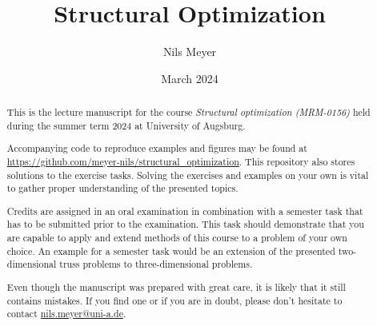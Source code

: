 \documentclass[a4paper]{report}
\title{Structural Optimization}
\author{Nils Meyer}
\date{March 2024}
\begin{document}
\maketitle

\begin{abstract}
    This is the lecture manuscript for the course \emph{Structural optimization (MRM-0156)} held during the summer term 2024 at University of Augsburg. 

    Accompanying code to reproduce examples and figures may be found at \url{https://github.com/meyer-nils/structural_optimization}. This repository also stores solutions to the exercise tasks. Solving the exercises and examples on your own is vital to gather proper understanding of the presented topics. 

    Credits are assigned in an oral examination in combination with a semester task that has to be submitted prior to the examination. This task should demonstrate that you are capable to apply and extend methods of this course to a problem of your own choice. An example for a semester task would be an extension of the presented two-dimensional truss problems to three-dimensional problems. 

    Even though the manuscript was prepared with great care, it is likely that it still contains mistakes. If you find one or if you are in doubt, please don't hesitate to contact \href{mailto:nils.meyer@uni-a.de}{nils.meyer@uni-a.de}. 
\end{abstract}

\setcounter{tocdepth}{1}
\tableofcontents









\end{document}
